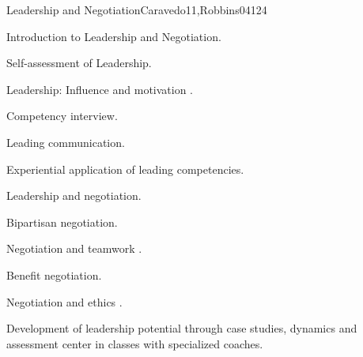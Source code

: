 \begin{syllabus}
\begin{unit}{Leadership and Negotiation}{}{Caravedo11,Robbins04}{12}{4}
   \begin{topics}
      \item Introduction to Leadership and Negotiation.
      \item Self-assessment of Leadership.
      \item Leadership: Influence and motivation .  
      \item Competency interview.
      \item Leading communication.   
      \item Experiential application of leading competencies.
      \item Leadership and negotiation.
      \item Bipartisan negotiation.
      \item Negotiation and teamwork .
      \item Benefit negotiation.
      \item Negotiation and ethics .  
 
      
   \end{topics}
   \begin{learningoutcomes}
      \item Development of leadership potential through case studies, dynamics and assessment center in classes with specialized coaches.
   \end{learningoutcomes}
\end{unit}

\begin{coursebibliography}
\end{coursebibliography}

\end{syllabus}
